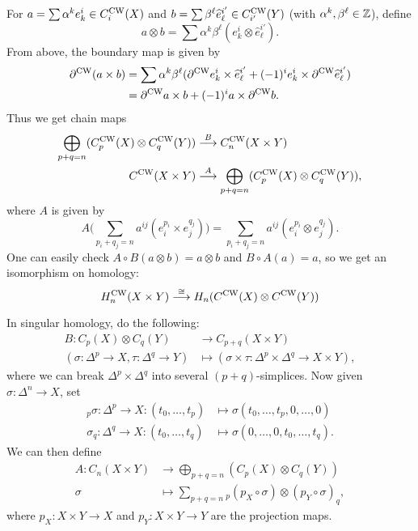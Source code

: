 \begin{remark}
  For $a = \sum \alpha^k e^i_k \in C^{\mathrm{CW}}_i(X)$ and
  $b = \sum \beta^\ell \widehat{e}^{i'}_{\ell} \in C^{\mathrm{CW}}_{i'}(Y)$ (with $\alpha^k, \beta^\ell \in \mathbb{Z}$),
  define
  \[
    a \otimes b = \sum \alpha^k \beta^\ell (e^i_k \otimes \widehat{e}^{i'}_{\ell}).
  \]
  From above, the boundary map
  is given by
  \begin{align*}
    \partial^{\mathrm{CW}}(a \times b)
    &= \sum \alpha^k \beta^\ell (\partial^{\mathrm{CW}} e^i_k \times \widehat{e}^{i'}_{\ell} + (-1)^i e^i_k \times \partial^{\mathrm{CW}} \widehat{e}^{i'}_{\ell}) \\
    &= \partial^{\mathrm{CW}} a \times b + (-1)^i a \times \partial^{\mathrm{CW}} b.
  \end{align*}
  Thus we get chain maps
  \begin{align*}
    \bigoplus_{p + q = n} (C^{\mathrm{CW}}_p(X) \otimes C^{\mathrm{CW}}_q(Y))
    &\overset{B}{\longrightarrow} C^{\mathrm{CW}}_n(X \times Y) \\
    C^{\mathrm{CW}}(X \times Y)
    &\overset{A}{\longrightarrow} \bigoplus_{p + q = n} (C^{\mathrm{CW}}_p(X) \otimes C^{\mathrm{CW}}_q(Y)),
  \end{align*}
  where $A$ is given by
  \[
    A\Bigg(\sum_{p_i + q_j = n} a^{ij} (e_i^{p_i} \times e_j^{q_j})\Bigg)
    = \sum_{p_i + q_j = n} a^{ij} (e_i^{p_i} \otimes e_j^{q_j}).
  \]
  One can easily check $A \circ B(a \otimes b) = a \otimes b$ and
  $B \circ A(a) = a$, so we get an isomorphism
  on homology:
  \[
    H_n^{\mathrm{CW}}(X \times Y) \overset{\cong}{\longrightarrow}
    H_n(C^{\mathrm{CW}}(X) \otimes C^{\mathrm{CW}}(Y))
  \]
\end{remark}

\begin{remark}
  In singular homology, do the following:
  \begin{align*}
    B : C_p(X) \otimes C_q(Y)
    &\longrightarrow C_{p + q}(X \times Y) \\
    (\sigma : \Delta^p \to X, \tau : \Delta^q \to Y)
    &\longmapsto (\sigma \times \tau : \Delta^{p} \times \Delta^q \to X \times Y),
  \end{align*}
  where we can break $\Delta^p \times \Delta^q$ into
  several $(p + q)$-simplices.
  Now given $\sigma : \Delta^n \to X$, set
  \begin{align*}
    {}_p\sigma : \Delta^p \to X : (t_0, \dots, t_p)
    &\longmapsto \sigma(t_0, \dots, t_p, 0, \dots, 0) \\
    \sigma_q : \Delta^q \to X : (t_0, \dots, t_q)
    &\longmapsto \sigma(0, \dots, 0, t_0, \dots, t_q).
  \end{align*}
  We can then define
  \begin{align*}
    A : C_n(X \times Y)
    &\longrightarrow \bigoplus_{p + q = n} (C_p(X) \otimes C_q(Y)) \\
    \sigma
    &\longmapsto \sum_{p + q = n} {}_p(p_X \circ \sigma) \otimes (p_Y \circ \sigma)_q,
  \end{align*}
  where $p_X : X \times Y \to X$ and $p_Y : X \times Y \to Y$ are the projection maps.
\end{remark}

